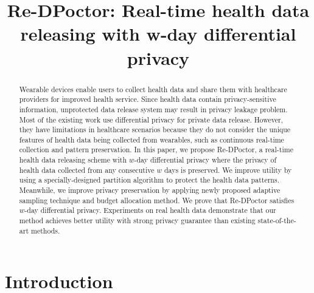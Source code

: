 \documentclass[10pt,conference]{IEEEtran}
\begin{document}
\title{Re-DPoctor: Real-time health data releasing with w-day differential privacy}

\author{
}

\maketitle

\begin{abstract}
Wearable devices enable users to collect health data and share them with healthcare providers for improved health service. Since health data contain privacy-sensitive information, unprotected data release system may result in privacy leakage problem. Most of the existing work use differential privacy for private data release. However, they have limitations in healthcare scenarios because they do not consider the unique features of health data being collected from wearables, such as continuous real-time collection and pattern preservation. In this paper, we propose Re-DPoctor, a real-time health data releasing scheme with $w$-day differential privacy where the privacy of health data collected from any consecutive $w$ days is preserved. We improve utility by using a specially-designed partition algorithm to protect the health data patterns. Meanwhile, we improve privacy preservation by applying newly proposed adaptive sampling technique and budget allocation method. We prove that Re-DPoctor satisfies $w$-day differential privacy. Experiments on real health data demonstrate that our method achieves better utility with strong privacy guarantee than existing state-of-the-art methods.
\end{abstract}


\IEEEpeerreviewmaketitle

\section{Introduction}
\end{document}
